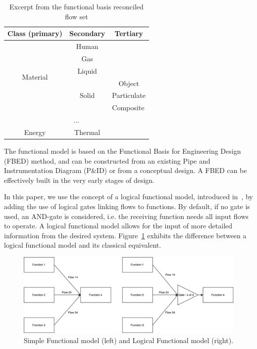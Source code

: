 \begin{table}[t] \tiny
\centering
\caption{Excerpt from the functional basis reconciled flow set}
\label{tab:fbed_flow}
\begin{tabular}{|c|c|c|}
\hline
Class (primary)              & Secondary                    & Tertiary                         \\ \hline
\multirow{6}{*}{Material}    & Human                        &                                  \\ \cline{2-3} 
                             & Gas                          &                                  \\ \cline{2-3} 
                             & Liquid                       &                                  \\ \cline{2-3} 
                             & \multirow{3}{*}{Solid}       & Object                           \\ \cline{3-3} 
                             &                              & \multicolumn{1}{l|}{Particulate} \\ \cline{3-3} 
                             &                              & \multicolumn{1}{l|}{Composite}   \\ \hline
\multicolumn{3}{|c|}{...}                                                                      \\ \hline
Energy & Thermal &             \\ \hline
\end{tabular}
\end{table}


The functional model is based on the Functional Basis for Engineering Design (FBED) method, and can be constructed from an existing Pipe and Instrumentation Diagram (P\&ID) or from a conceptual design. A FBED can be effectively built in the very early stages of design.


In this paper, we use the concept of a logical functional model, introduced in~\cite{lher2016}, by adding the use of logical gates linking flows to functions. By default, if no gate is used, an AND-gate is considered, i.e. the receiving function needs all input flows to operate. A logical functional model allows for the input of more detailed information from the desired system. Figure~\ref{fig:fmex_gate} exhibits the difference between a logical functional model and its classical equivalent.


\begin{figure}[!htb]
\centering
\includegraphics[scale=.5]{fig/Gate3}
\caption{Simple Functional model (left) and Logical Functional model (right).}
\label{fig:fmex_gate}
\end{figure}

